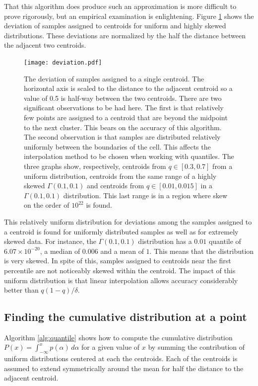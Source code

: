 \documentclass[11pt]{amsart}
\begin{document}
That this algorithm does produce such an approximation is more difficult to prove rigorously, but an empirical examination is enlightening.  Figure \ref{fig:deviation} shows the deviation of samples assigned to centroids for uniform and highly skewed distributions.  These deviations are normalized by the half the distance between the adjacent two centroids.
\begin{figure}[htb] %
   \centering
   \texttt{[image: deviation.pdf]} 
   \caption{The deviation of samples assigned to a single centroid.  The horizontal axis is scaled to the distance to the adjacent centroid so a value of 0.5 is half-way between the two centroids. There are two significant observations to be had here.  The first is that relatively few points are assigned to a centroid that are beyond the midpoint to the next cluster.  This bears on the accuracy of this algorithm.  The second observation is that samples are distributed relatively uniformly between the boundaries of the cell.  This affects the interpolation method to be chosen when working with quantiles. The three graphs show, respectively, centroids from $q \in [0.3, 0.7]$ from a uniform distribution, centroids from the same range of a highly skewed $\Gamma(0.1, 0.1)$ and centroids from $q \in [0.01, 0.015]$ in a $\Gamma(0.1, 0.1)$ distribution.  This last range is in a region where skew on the order of $10^{22}$ is found. }
   \label{fig:deviation}
\end{figure}
This relatively uniform distribution for deviations among the samples assigned to a centroid is found for uniformly distributed samples as well as for extremely skewed data.  For instance, the $\Gamma(0.1, 0.1)$ distribution has a $0.01$ quantile of $6.07 \times 10^{-20}$, a median of $0.006$ and a mean of $1$.  This means that the distribution is very skewed.  In spite of this, samples assigned to centroids near the first percentile are not noticeably skewed within the centroid.  The impact of this uniform distribution is that linear interpolation allows accuracy considerably better than $q(1-q)/\delta$.

\subsection{Finding the cumulative distribution at a point}
Algorithm \ref{alg:quantile} shows how to compute the cumulative distribution $P(x)=\int_{-\infty}^x p(\alpha) \, d\alpha$ for a given value of $x$ by summing the contribution of uniform distributions centered at each the centroids.  Each of the centroids is assumed to extend symmetrically around the mean for half the distance to the adjacent centroid.
\end{document}
